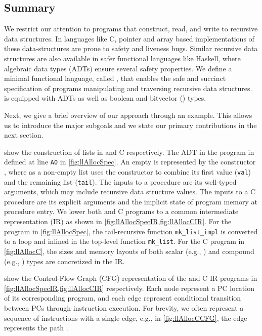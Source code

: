 \subsection{Summary}
\label{sec:summary}
We restrict our attention to programs that construct, read, and write
to recursive data structures. In languages like C, pointer and array based
implementations of these data-structures are prone to safety and liveness bugs.
Similar recursive data structures are also available in safer functional languages like Haskell,
where algebraic data types (ADTs) \cite{hope} ensure several safety properties.
We define a minimal functional language, called \SpecL{}, that enables the safe
and succinct specification of programs manipulating and traversing recursive data structures.
\SpecL{} is equipped with ADTs as well as boolean and bitvector () types.

Next, we give a brief overview of our approach through an example.
This allows us to introduce the major subgoals and
we state our primary contributions in the next section.





 show the construction of lists in \SpecL{} and C respectively.
The  ADT in the \SpecL{} program in defined at line {\tt A0} in \cref{fig:llAllocSpec}.
An empty  is represented by the constructor , where as a non-empty list uses
the  constructor to combine its first value ({\tt val}) and
the remaining list ({\tt tail}).
The inputs to a \SpecL{} procedure are its well-typed arguments, which may include recursive data structure
values. The inputs to a C procedure are its explicit arguments and the implicit state of program memory
at procedure entry.
We lower both \SpecL{} and C programs to a common intermediate representation (IR)
as shown in \cref{fig:llAllocSpecIR,fig:llAllocCIR}.
For the \SpecL{} program in \cref{fig:llAllocSpec},
the tail-recursive function {\tt mk\_list\_impl} is converted to a loop and
inlined in the top-level function {\tt mk\_list}.
For the C program in \cref{fig:llAllocC},
the sizes and memory layouts of both scalar (e.g., )
and compound (e.g., ) types are concretized in the IR.



 show the Control-Flow Graph (CFG) representation
of the \SpecL{} and C IR programs in \cref{fig:llAllocSpecIR,fig:llAllocCIR} respectively.
Each node represent a PC location of its corresponding program, and each edge represent
conditional transition between PCs through instruction execution.
For brevity, we often represent a sequence of instructions with a single edge, e.g.,
in \cref{fig:llAllocCCFG}, the edge  represents the path .

